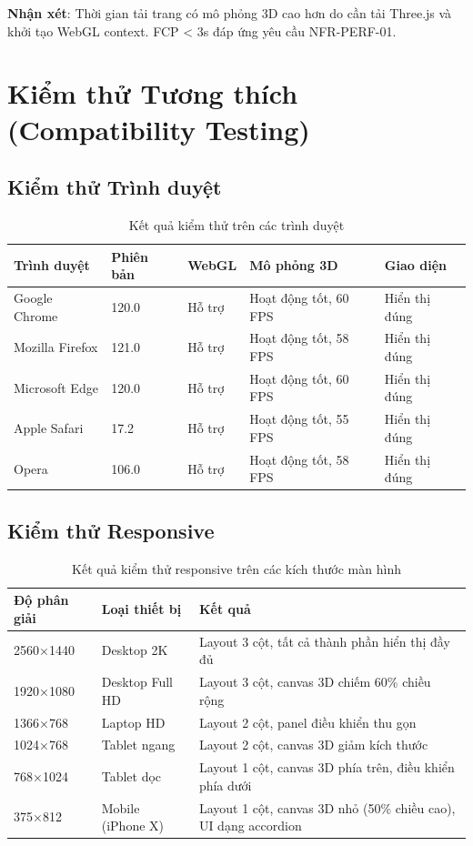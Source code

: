 \textbf{Nhận xét}: Thời gian tải trang có mô phỏng 3D cao hơn do cần tải Three.js và khởi tạo WebGL context. FCP < 3s đáp ứng yêu cầu NFR-PERF-01.

\section{Kiểm thử Tương thích (Compatibility Testing)}

\subsection{Kiểm thử Trình duyệt}

\begin{table}[H]
\centering
\caption{Kết quả kiểm thử trên các trình duyệt}
\begin{tabular}{|p{}|p{}|p{}|p{}|p{}|}
\hline
\textbf{Trình duyệt} & \textbf{Phiên bản} & \textbf{WebGL} & \textbf{Mô phỏng 3D} & \textbf{Giao diện} \\
\hline
Google Chrome & 120.0 & Hỗ trợ & Hoạt động tốt, 60 FPS & Hiển thị đúng \\
\hline
Mozilla Firefox & 121.0 & Hỗ trợ & Hoạt động tốt, 58 FPS & Hiển thị đúng \\
\hline
Microsoft Edge & 120.0 & Hỗ trợ & Hoạt động tốt, 60 FPS & Hiển thị đúng \\
\hline
Apple Safari & 17.2 & Hỗ trợ & Hoạt động tốt, 55 FPS & Hiển thị đúng \\
\hline
Opera & 106.0 & Hỗ trợ & Hoạt động tốt, 58 FPS & Hiển thị đúng \\
\hline
\end{tabular}
\end{table}

\subsection{Kiểm thử Responsive}

\begin{table}[H]
\centering
\caption{Kết quả kiểm thử responsive trên các kích thước màn hình}
\begin{tabular}{|p{}|p{}|p{}|}
\hline
\textbf{Độ phân giải} & \textbf{Loại thiết bị} & \textbf{Kết quả} \\
\hline
2560×1440 & Desktop 2K & Layout 3 cột, tất cả thành phần hiển thị đầy đủ \\
\hline
1920×1080 & Desktop Full HD & Layout 3 cột, canvas 3D chiếm 60\% chiều rộng \\
\hline
1366×768 & Laptop HD & Layout 2 cột, panel điều khiển thu gọn \\
\hline
1024×768 & Tablet ngang & Layout 2 cột, canvas 3D giảm kích thước \\
\hline
768×1024 & Tablet dọc & Layout 1 cột, canvas 3D phía trên, điều khiển phía dưới \\
\hline
375×812 & Mobile (iPhone X) & Layout 1 cột, canvas 3D nhỏ (50\% chiều cao), UI dạng accordion \\
\hline
\end{tabular}
\end{table}

